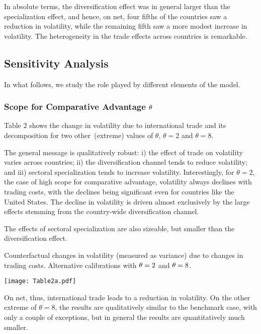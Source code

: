 \documentclass[12pt]{article}
\begin{document}
In absolute terms, the diversification effect was in general larger than the
specialization effect, and hence, on net, four fifths of the countries saw a
reduction in volatility, while the remaining fifth saw a more modest
increase in volatility. The heterogeneity in the trade effects across
countries is remarkable.

\subsection{Sensitivity Analysis}

In what follows, we study the role played by different elements of the model.

\subsubsection{Scope for Comparative Advantage $\protect\theta $}

Table $2$ shows the change in volatility due to international trade and its
decomposition for two other\ (extreme) values of $\theta $, $\theta =2$ and $%
\theta =8.$

The general message is qualitatively robust: i) the effect of trade on
volatility varies across countries; ii) the diversification channel tends to
reduce volatility; and iii) sectoral specialization tends to increase
volatility. Interestingly, for $\theta =2$, the case of high scope for
comparative advantage, volatility always declines with trading costs, with
the declines being significant even for countries like the United States.
The decline in volatility is driven almost exclusively by the large effects
stemming from the country-wide diversification channel.

The effects of sectoral specialization are also sizeable, but smaller than
the diversification effect. 

\begin{table}[h]
\caption{Counterfactual changes in volatility (measured as variance) due to
changes in trading costs. Alternative calibrations with $\protect\theta =2$
and $\protect\theta =8$.}\centering\texttt{[image: Table2a.pdf]}
\end{table}

On net, thus, international trade leads to a reduction in volatility. On the
other extreme of $\theta =8$, the results are qualitatively similar to the
benchmark case, with only a couple of exceptions, but in general the results
are quantitatively much smaller.
\end{document}
